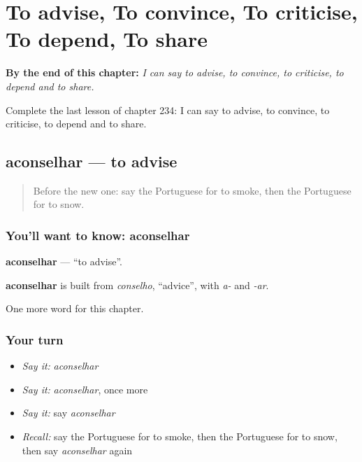 
\chapter{To advise, To convince, To criticise, To depend, To share}
\label{ch:pt-to-advise-to-convince-to-criticise-to-depend-to-share}

\begin{chapteropening}
\textbf{By the end of this chapter:} \emph{I can say to advise, to convince, to criticise, to depend and to share.}

Complete the last lesson of chapter 234: I can say to advise, to convince, to criticise, to depend and to share.
\end{chapteropening}

\section[aconselhar]{aconselhar — to advise}

\label{lesson:PT-C234-aconselhar}



\begin{quote}
Before the new one: say the Portuguese for to smoke, then the Portuguese for to snow.
\end{quote}

\subsection*{You'll want to know: aconselhar}
\textbf{aconselhar} — \textquotedblleft{}to advise\textquotedblright{}.

\begin{cousinweb}
\textbf{aconselhar} is built from \emph{conselho}, \textquotedblleft{}advice\textquotedblright{}, with \emph{a-} and \emph{-ar}.
\end{cousinweb}

\begin{grammarlens}[title={What you've built}]
One more word for this chapter.
\end{grammarlens}

\subsection*{Your turn}
\begin{itemize}
\raggedright
  \item \emph{Say it:} \emph{aconselhar}
  \item \emph{Say it:} \emph{aconselhar}, once more
  \item \emph{Say it:} say \emph{aconselhar}
  \item \emph{Recall:} say the Portuguese for to smoke, then the Portuguese for to snow, then say \emph{aconselhar} again
\end{itemize}

